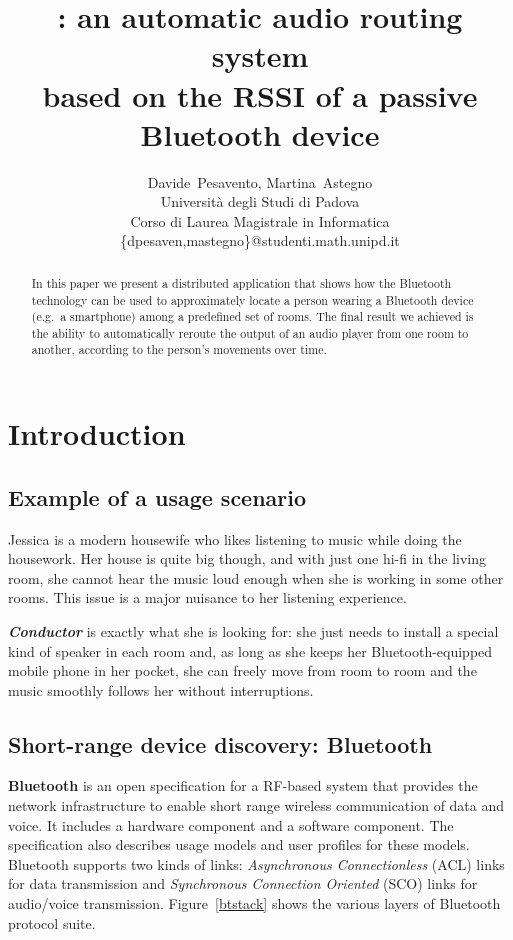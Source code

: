 \documentclass{IEEEtran}
\title{\Conductor{}: an automatic audio routing system \\
	based on the RSSI of a passive Bluetooth device}
\author{
	Davide~Pesavento, Martina~Astegno \\
	Università degli Studi di Padova \\
	Corso di Laurea Magistrale in Informatica \\
	\{dpesaven,mastegno\}@studenti.math.unipd.it
}
\newcommand{\Conductor}{\textsl{Conductor}}
\begin{document}
\maketitle

\begin{abstract}
In this paper we present a distributed application that shows how the Bluetooth technology can be used to approximately locate a person wearing a Bluetooth device (e.g.\ a smartphone) among a predefined set of rooms. The final result we achieved is the ability to automatically reroute the output of an audio player from one room to another, according to the person's movements over time.
\end{abstract}



\section{Introduction}

\subsection{Example of a usage scenario}
Jessica is a modern housewife who likes listening to music while doing the housework. Her house is quite big though, and with just one hi-fi in the living room, she cannot hear the music loud enough when she is working in some other rooms. This issue is a major nuisance to her listening experience.

\textbf{\Conductor{}} is exactly what she is looking for: she just needs to install a special kind of speaker in each room and, as long as she keeps her Bluetooth-equipped mobile phone in her pocket, she can freely move from room to room and the music smoothly follows her without interruptions.

\subsection{Short-range device discovery: Bluetooth}
\textbf{Bluetooth} is an open specification for a RF-based system that provides the network infrastructure to enable short range wireless communication of data and voice. It includes a hardware component and a software component. The specification also describes usage models and user profiles for these models.
Bluetooth supports two kinds of links: \textit{Asynchronous Connectionless} (ACL) links for data transmission and \textit{Synchronous Connection Oriented} (SCO) links for audio/voice transmission. Figure~\ref{btstack} shows the various layers of Bluetooth protocol suite.
\end{document}
